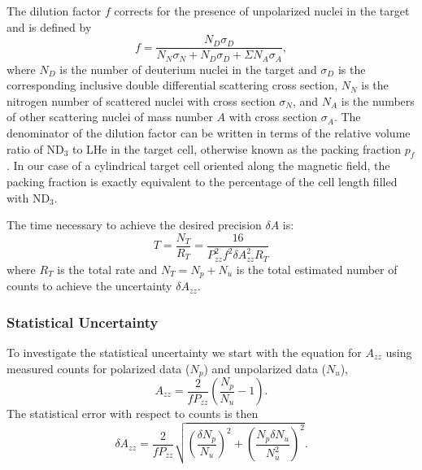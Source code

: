 The dilution factor $f$ corrects for the presence of unpolarized nuclei in the target and is defined by
\begin{equation}
f=\frac{N_D\sigma_D}{N_N\sigma_N+N_D\sigma_D+\Sigma N_A\sigma_A},
\end{equation}
where $N_D$ is the number of deuterium nuclei in the target and $\sigma_D$ 
is the corresponding inclusive double differential scattering cross 
section,
$N_N$ is the nitrogen number of scattered nuclei with cross section $\sigma_N$, and
$N_A$ is the numbers of other scattering nuclei of mass number $A$ with cross section $\sigma_A$.
The denominator of the dilution factor can be written in terms of the relative volume ratio of
ND$_3$ to LHe in the target cell, otherwise known as  the packing fraction $p_f$.  In our case of a cylindrical target cell oriented along the magnetic field,
the packing fraction is exactly equivalent to the percentage of the cell length filled with ND$_3$.  

The time necessary to achieve the desired precision $\delta A$ is:
\begin{equation}
T=\frac{N_T}{R_T}=\frac{16}{P_{zz}^2f^2\delta A_{zz}^2R_T}
\end{equation} 
where $R_T$ is the total rate and $N_T = N_p + N_u$ is the total estimated 
number of counts to achieve the uncertainty $\delta A_{zz}$.  



\subsubsection{Statistical Uncertainty}
\label{stat}
To investigate the statistical uncertainty we start with the equation for $A_{zz}$ using
measured counts for polarized data ($N_p$) and unpolarized data ($N_u$), 
\begin{equation}
A_{zz}=\frac{2}{fP_{zz}}\left(\frac{N_p}{N_u}-1\right).
\end{equation}
The statistical error with respect to counts is then
\begin{equation}
\delta A_{zz}=\frac{2}{fP_{zz}}\sqrt{\left(\frac{\delta N_p}{N_u}\right)^2+\left(\frac{N_p\delta N_u}{N_u^2}\right)^2}.
\end{equation}


